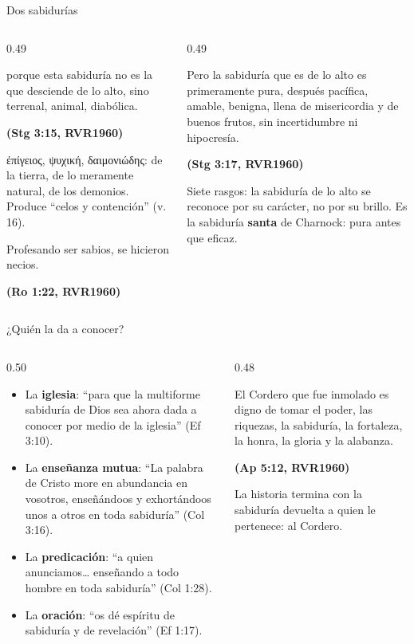 \documentclass[hyperref={bookmarks=false},aspectratio=169]{beamer}
\newcommand{\grc}[1]{\foreignlanguage{ancientgreek}{#1}}
\newcommand{\fuente}[1]{\par\hfill{\upshape\bfseries\footnotesize\textcolor{azul}{#1}}}
\newcommand{\destacar}[1]{\textbf{\textcolor{azul}{#1}}}
\begin{document}
\begin{frame}{Dos sabidurías}
\begin{columns}[t,onlytextwidth]
\begin{column}{0.49\textwidth}
\begin{cita}porque esta sabiduría no es la que desciende de lo alto, sino terrenal, animal, diabólica.\fuente{(Stg 3:15, RVR1960)}\end{cita}
\scriptsize\grc{ἐπίγειος, ψυχική, δαιμονιώδης}: de la tierra, de lo meramente natural, de los demonios. Produce ``celos y contención'' (v. 16).\par\medskip
\begin{cita}Profesando ser sabios, se hicieron necios.\fuente{(Ro 1:22, RVR1960)}\end{cita}
\end{column}
\begin{column}{0.49\textwidth}
\begin{cita}Pero la sabiduría que es de lo alto es primeramente pura, después pacífica, amable, benigna, llena de misericordia y de buenos frutos, sin incertidumbre ni hipocresía.\fuente{(Stg 3:17, RVR1960)}\end{cita}
\scriptsize Siete rasgos: la sabiduría de lo alto se reconoce por su carácter, no por su brillo. Es la sabiduría \destacar{santa} de Charnock: pura antes que eficaz.
\end{column}
\end{columns}
\end{frame}

\begin{frame}{¿Quién la da a conocer?}
\begin{columns}[t,onlytextwidth]
\begin{column}{0.50\textwidth}\small
\begin{itemize}
\item La \destacar{iglesia}: ``para que la multiforme sabiduría de Dios sea ahora dada a conocer por medio de la iglesia'' (Ef 3:10).
\item La \destacar{enseñanza mutua}: ``La palabra de Cristo more en abundancia en vosotros, enseñándoos y exhortándoos unos a otros en toda sabiduría'' (Col 3:16).
\item La \destacar{predicación}: ``a quien anunciamos\ldots{} enseñando a todo hombre en toda sabiduría'' (Col 1:28).
\item La \destacar{oración}: ``os dé espíritu de sabiduría y de revelación'' (Ef 1:17).
\end{itemize}
\end{column}
\begin{column}{0.48\textwidth}
\begin{cita}El Cordero que fue inmolado es digno de tomar el poder, las riquezas, la sabiduría, la fortaleza, la honra, la gloria y la alabanza.\fuente{(Ap 5:12, RVR1960)}\end{cita}
\small La historia termina con la sabiduría devuelta a quien le pertenece: al Cordero.
\end{column}
\end{columns}
\end{frame}
\end{document}
